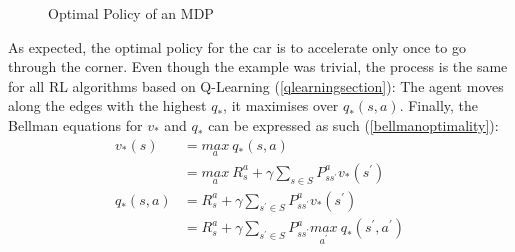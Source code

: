 \begin{figure}[H]
\caption{Optimal Policy of an MDP}
\label{optimalpolicymdp}
\end{figure}
 
As expected, the optimal policy for the car is to accelerate only once to go through the corner. Even though the example was trivial, the process is the same for all RL algorithms based on Q-Learning (\ref{qlearningsection}): The agent moves along the edges with the highest $q_*$, it maximises over $q_*(s,a)$.
\newline
Finally, the Bellman equations for $v_*$ and $q_*$ can be expressed as such (\ref{bellmanoptimality}):
\begin{equation}
\label{bellmanoptimality}
	\begin{split}
		v_*(s) & = \underset{a}{max} \: q_*(s,a) \\
		& = \underset{a}{max} \: R_{s}^{a} + \gamma \sum\limits_{s \in S}P_{ss^{'}}^{a} v_*(s^{'}) \\
		q_*(s,a) & = R_{s}^{a} + \gamma \sum\limits_{s^{'} \in S} P_{ss^{'}}^{a} v_*(s^{'}) \\
		& = R_{s}^{a}+\gamma \sum\limits_{s^{'} \in S}P_{ss^{'}}^{a}\underset{a^{'}}{max} \: q_*(s^{'},a^{'})
	\end{split}
\end{equation}

